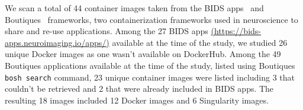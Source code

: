 \documentclass[a4paper,num-refs]{oup-contemporary}
\begin{document}
We scan a total of 44 container images taken from the BIDS
apps~\cite{gorgolewski2017bids} and Boutiques~\cite{glatard2018boutiques}
frameworks, two containerization frameworks used in neuroscience to share
and re-use applications. Among the 27 BIDS apps \href{https://bids-apps.neuroimaging.io/apps/}
{(https://bids-apps.neuroimaging.io/apps/)} available at the time of
the study, we studied 26
unique Docker images as one wasn't available on DockerHub. Among the 49
Boutiques applications available at the time of the study, listed using
Boutiques \texttt{bosh search} command, 23 unique container images were
listed including 3 that couldn't be retrieved and 2 that were already
included in BIDS apps. The resulting 18 images included 12 Docker images
and 6 Singularity images.
\end{document}
